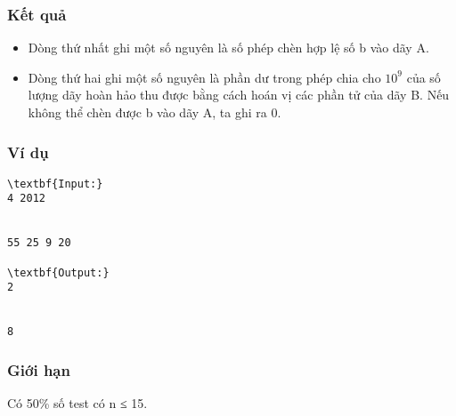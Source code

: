 \subsubsection{   Kết quả  }
\begin{itemize}
	\item     Dòng thứ nhất ghi một số nguyên là số phép chèn hợp lệ số b vào dãy A.   
	\item     Dòng thứ hai ghi một số nguyên là phần dư trong phép chia cho $10^{9}$    của số lượng dãy hoàn hảo thu được bằng cách hoán vị các phần tử của dãy B. Nếu không thể chèn được b vào dãy A, ta ghi ra 0.   
\end{itemize}

\subsubsection{   Ví dụ  }
\begin{verbatim}
\textbf{Input:}
4 2012


55 25 9 20

\textbf{Output:}
2


8\end{verbatim}

\subsubsection{   Giới hạn  }

   Có 50\% số test có n ≤ 15.  
